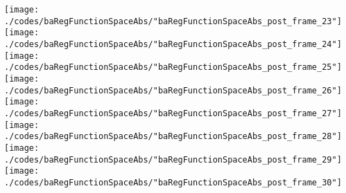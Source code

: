 \begin{frame}{\insertsection}
\begin{center}
{\begin{animateinline}{15}
				 \texttt{[image: ./codes/baRegFunctionSpaceAbs/"baRegFunctionSpaceAbs\_post\_frame\_23"]}\newframe
				 \texttt{[image: ./codes/baRegFunctionSpaceAbs/"baRegFunctionSpaceAbs\_post\_frame\_24"]}\newframe
				 \texttt{[image: ./codes/baRegFunctionSpaceAbs/"baRegFunctionSpaceAbs\_post\_frame\_25"]}\newframe
				 \texttt{[image: ./codes/baRegFunctionSpaceAbs/"baRegFunctionSpaceAbs\_post\_frame\_26"]}\newframe
				 \texttt{[image: ./codes/baRegFunctionSpaceAbs/"baRegFunctionSpaceAbs\_post\_frame\_27"]}\newframe
				 \texttt{[image: ./codes/baRegFunctionSpaceAbs/"baRegFunctionSpaceAbs\_post\_frame\_28"]}\newframe
				 \texttt{[image: ./codes/baRegFunctionSpaceAbs/"baRegFunctionSpaceAbs\_post\_frame\_29"]}\newframe
				 \texttt{[image: ./codes/baRegFunctionSpaceAbs/"baRegFunctionSpaceAbs\_post\_frame\_30"]}
			 \end{animateinline}
			}
	\end{center}
    
\end{frame}



